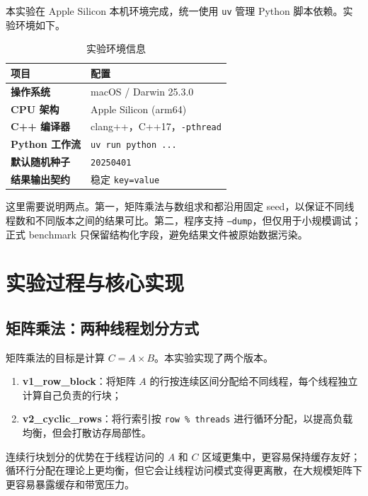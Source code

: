 \documentclass[UTF8,a4paper,12pt,fontset=none]{ctexart}
\begin{document}
本实验在 Apple Silicon 本机环境完成，统一使用 \texttt{uv} 管理 Python 脚本依赖。实验环境如下。

\begin{table}[H]
  \centering
  \caption{实验环境信息}
  \renewcommand{\arraystretch}{1.2}
  \begin{tabularx}{0.92\textwidth}{>{\bfseries}p{4cm}X}
    \toprule
    项目 & 配置 \\
    \midrule
    操作系统 & macOS / Darwin 25.3.0 \\
    CPU 架构 & Apple Silicon (arm64) \\
    C++ 编译器 & clang++，C++17，\texttt{-pthread} \\
    Python 工作流 & \texttt{uv run python ...} \\
    默认随机种子 & \texttt{20250401} \\
    结果输出契约 & 稳定 \texttt{key=value} \\
    \bottomrule
  \end{tabularx}
\end{table}

这里需要说明两点。第一，矩阵乘法与数组求和都沿用固定 seed，以保证不同线程数和不同版本之间的结果可比。第二，程序支持 \texttt{--dump}，但仅用于小规模调试；正式 benchmark 只保留结构化字段，避免结果文件被原始数据污染。

\section{实验过程与核心实现}

\subsection{矩阵乘法：两种线程划分方式}

矩阵乘法的目标是计算 \(C=A\times B\)。本实验实现了两个版本。

\begin{enumerate}[leftmargin=2.2em]
  \item \textbf{v1\_row\_block}：将矩阵 \(A\) 的行按连续区间分配给不同线程，每个线程独立计算自己负责的行块；
  \item \textbf{v2\_cyclic\_rows}：将行索引按 \texttt{row \% threads} 进行循环分配，以提高负载均衡，但会打散访存局部性。
\end{enumerate}

连续行块划分的优势在于线程访问的 \(A\) 和 \(C\) 区域更集中，更容易保持缓存友好；循环行分配在理论上更均衡，但它会让线程访问模式变得更离散，在大规模矩阵下更容易暴露缓存和带宽压力。
\end{document}
